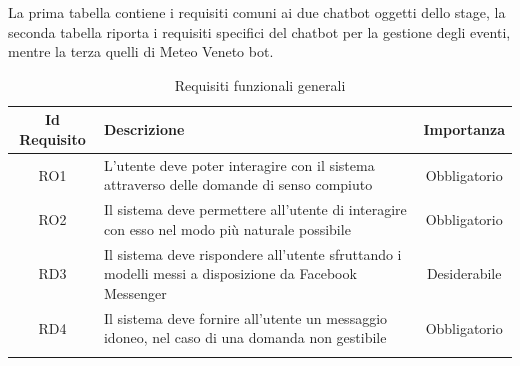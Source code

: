 La prima tabella contiene i requisiti comuni ai due \gls{chatbot} oggetti dello stage, la seconda tabella riporta i requisiti specifici del \gls{chatbot} per la gestione degli eventi, mentre la terza quelli di Meteo Veneto bot.
\newpage
\normalsize
\begin{longtable}{|c|>{\centering}m{7cm}|c|}
\hline
\textbf{Id Requisito} & \textbf{Descrizione} & \textbf{Importanza}\\
\hline
\endhead
RO1 & L'utente deve poter interagire con il sistema attraverso delle domande di senso compiuto & Obbligatorio\\ 
RO2 & Il sistema deve permettere all'utente di interagire con esso nel modo più naturale possibile & Obbligatorio \\
RD3 & Il sistema deve rispondere all'utente sfruttando i modelli messi a disposizione da Facebook Messenger & Desiderabile\\
RD4 & Il sistema deve fornire all'utente un messaggio idoneo, nel caso di una domanda non gestibile & Obbligatorio\\
\hline
\caption{Requisiti funzionali generali}
\end{longtable}

